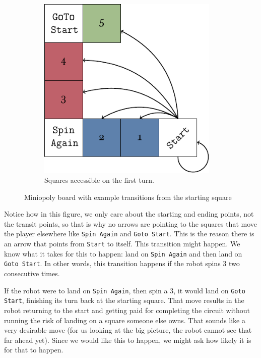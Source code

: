 \begin{figure}[h]
\begin{subfigure}[t]{0.55\textwidth}
		\includegraphics[width=0.95\textwidth]{img/diagram-start.pdf}
		\caption{Squares accessible on the first turn.}
		\label{fig:miniopoly-diagram-start}
	\end{subfigure}
    \caption{Miniopoly board with example transitions from the starting square}
    \label{figs:miniopoly-boards-transitions}
\end{figure}

Notice how in this figure, we only care about the starting and ending points,
not the transit points, so that is why no arrows are pointing to the squares
that move the player elsewhere like \texttt{Spin Again} and \texttt{Goto Start}.
This is the reason there is an arrow that points from \texttt{Start} to itself.
This transition might happen. We know what it takes for this to happen: land on
\texttt{Spin Again} and then land on \texttt{Goto Start}. In other words, this
transition happens if the robot spins 3 two consecutive times.

If the robot were to land on \texttt{Spin Again}, then spin a 3, it would land
on \texttt{Goto Start}, finishing its turn back at the starting square. That
move results in the robot returning to the start and getting paid for completing
the circuit without running the risk of landing on a square someone else owns.
That sounds like a very desirable move (for us looking at the big picture, the
robot cannot see that far ahead yet). Since we would like this to happen, we
might ask how likely it is for that to happen.

